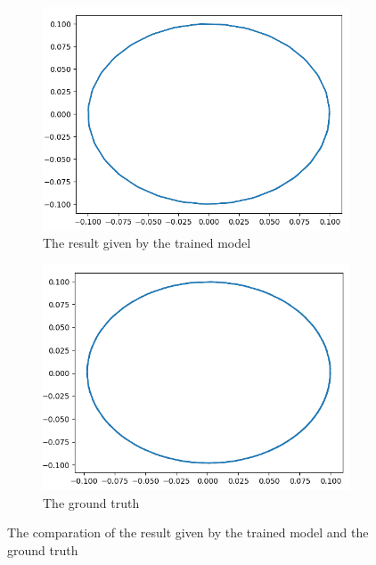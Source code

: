 \documentclass{article}
\begin{document}
\begin{figure}[h]
	\centering
	\begin{subfigure}[b]{0.45\linewidth}
		\includegraphics[width=\linewidth]{spring_learned.png}
		\caption{The result given by the trained model}
	\end{subfigure}
	\begin{subfigure}[b]{0.45\linewidth}
		\includegraphics[width=\linewidth]{spring_truth.png}
		\caption{The ground truth}
	\end{subfigure}
	\caption{The comparation of the result given by the trained model and the ground truth}
	\label{fig:spring_comp}
\end{figure}
\end{document}
